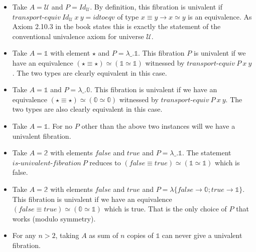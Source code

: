 \documentclass{entcs}
\newcommand{\zt}{\mathbb{0}}
\newcommand{\ot}{\mathbb{1}}
\newcommand{\bt}{\mathbb{2}}
\newcommand{\fc}{\mathit{false}}
\newcommand{\tc}{\mathit{true}}
\begin{document}
\begin{itemize}

\item Take $A = \mathcal{U}$ and $P = \mathit{Id}_{\mathcal{U}}$. By definition,
  this fibration is univalent if
  $\textit{transport-equiv}~\mathit{Id}_{\mathcal{U}}~x~y = \mathit{idtoeqv}$ of
    type $x \equiv y \to x \simeq y$ is an equivalence. As Axiom 2.10.3 in the
    book states this is exactly the statement of the conventional univalence
    axiom for universe $\mathcal{U}$.

\item Take $A = \ot$ with element $\star$ and $P = \lambda \_. \ot$. This
    fibration $P$ is univalent if we have an equivalence
    $(\star\equiv\star) \simeq (\ot\simeq\ot)$ witnessed by
    $\textit{transport-equiv}~P~x~y$. The two types are clearly equivalent in
    this case.

\item Take $A = \ot$ and $P = \lambda \_. \zt$. This fibration is univalent if
    we have an equivalence $(\star\equiv\star)\simeq(\zt\simeq\zt)$ witnessed by
    $\textit{transport-equiv}~P~x~y$. The two types are also clearly equivalent
    in this case.

\item Take $A = \ot$. For no $P$ other than the above two instances will we
    have a univalent fibration.

\item Take $A = \bt$ with elements $\fc$ and $\tc$ and
  $P = \lambda \_. \ot$. The statement
  $\textit{is-univalent-fibration}~P$ reduces to $(\fc \equiv \tc) \simeq
  (\ot\simeq\ot)$ which is false.

\item Take $A = \bt$ with elements $\fc$ and $\tc$ and
  $P = \lambda \{ \fc \to \zt; \tc \to \ot \}$. This fibration is univalent if
  we have an equivalence $(\fc \equiv \tc) \simeq (\zt\simeq\ot)$ which is
  true. That is the only choice of $P$ that works (modulo symmetry).

\item For any $n > 2$, taking $A$ as sum of $n$ copies of $\ot$ can never
  give a univalent fibration.


\end{itemize}
\end{document}
